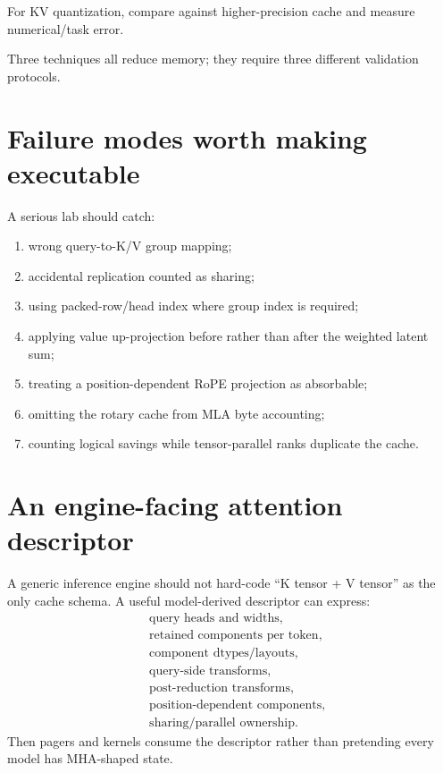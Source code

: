 For KV quantization, compare against higher-precision cache and measure numerical/task
error.

Three techniques all reduce memory; they require three different validation protocols.

\section{Failure modes worth making executable}

A serious lab should catch:
\begin{enumerate}
\item wrong query-to-K/V group mapping;
\item accidental replication counted as sharing;
\item using packed-row/head index where group index is required;
\item applying value up-projection before rather than after the weighted latent sum;
\item treating a position-dependent RoPE projection as absorbable;
\item omitting the rotary cache from MLA byte accounting;
\item counting logical savings while tensor-parallel ranks duplicate the cache.
\end{enumerate}

\section{An engine-facing attention descriptor}

A generic inference engine should not hard-code ``K tensor + V tensor'' as the only
cache schema. A useful model-derived descriptor can express:
\[
\begin{aligned}
&\text{query heads and widths},\\
&\text{retained components per token},\\
&\text{component dtypes/layouts},\\
&\text{query-side transforms},\\
&\text{post-reduction transforms},\\
&\text{position-dependent components},\\
&\text{sharing/parallel ownership}.
\end{aligned}
\]
Then pagers and kernels consume the descriptor rather than pretending every model has
MHA-shaped state.


